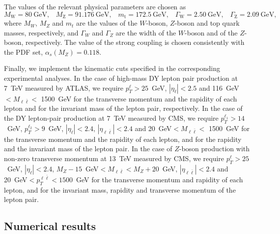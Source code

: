 The values of the relevant physical parameters are chosen as
\begin{equation}
M_\mathrm{W} = \SI{80}{\giga\electronvolt} \text{,} \quad 
M_\mathrm{Z} = \SI{91.176}{\giga\electronvolt} \text{,} \quad 
m_\mathrm{t} = \SI{172.5}{\giga\electronvolt} \text{,} \quad
\Gamma_\mathrm{W} = \SI{2.50}{\giga\electronvolt} \text{,} \quad
\Gamma_\mathrm{Z} = \SI{2.09}{\giga\electronvolt} \text{,} 
\label{eq:parameters}
\end{equation}
where $M_W$, $M_Z$ and $m_t$ are the values of the $W$-boson, $Z$-boson and
top quark masses, respectively, and $\Gamma_W$ and $\Gamma_Z$ are the width of
the $W$-boson and of the $Z$-boson, respectively. The value of the strong
coupling is chosen consistently with the PDF set, $\alpha_s(M_Z)=0.118$.

Finally, we implement the kinematic cuts specified in the corresponding
experimental analyses. In the case of high-mass DY lepton pair
production at 7~TeV measured by ATLAS, we require $p_T^\ell>25$~GeV,
$|\eta_\ell|<2.5$ and 116~GeV$<M_{\ell\bar\ell}<$ 1500~GeV for the transverse
momentum and the rapidity of each lepton and for the invariant mass of the
lepton pair, respectively. In the case of the DY lepton-pair production at
7~TeV measured by CMS, we require $p_T^{\ell_1}>14$~GeV, $p_T^{\ell_2}>9$~GeV,
$|\eta_\ell|<2.4$, $|\eta_{\ell\bar\ell}|<2.4$ and 20~GeV$<M_{\ell\bar\ell}<$ 1500~GeV
for the transverse momentum and the rapidity of each lepton, and for the
rapidity and the invariant mass of the lepton pair. In the case of $Z$-boson
production with non-zero transverse momentum at 13~TeV measured by CMS, we
require $p_T^\ell>25$~GeV, $|\eta_\ell|<2.4$,
$M_Z-15$~GeV$<M_{\ell\bar\ell}<M_Z+20$~GeV,
$|\eta_{\ell\bar\ell}|<2.4$ and 20~GeV$<p_T^{\ell\bar\ell}<1500$~GeV for the
transverse momentum and rapidity of each lepton, and for the invariant mass,
rapidity and transverse momentum of the lepton pair.

\subsection{Numerical results}
\label{subsec:numerical_results}

